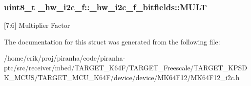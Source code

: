 \subsubsection[{\texorpdfstring{M\+U\+LT}{MULT}}]{\setlength{\rightskip}{0pt plus 5cm}uint8\+\_\+t \+\_\+hw\+\_\+i2c\+\_\+f\+::\+\_\+hw\+\_\+i2c\+\_\+f\+\_\+bitfields\+::\+M\+U\+LT}\hypertarget{struct__hw__i2c__f_1_1__hw__i2c__f__bitfields_ae12f63f9f20a5283884bcd839e7285d5}{}\label{struct__hw__i2c__f_1_1__hw__i2c__f__bitfields_ae12f63f9f20a5283884bcd839e7285d5}
\mbox{[}7\+:6\mbox{]} Multiplier Factor 

The documentation for this struct was generated from the following file\+:\begin{DoxyCompactItemize}
\item 
/home/erik/proj/piranha/code/piranha-\/ptc/src/receiver/mbed/\+T\+A\+R\+G\+E\+T\+\_\+\+K64\+F/\+T\+A\+R\+G\+E\+T\+\_\+\+Freescale/\+T\+A\+R\+G\+E\+T\+\_\+\+K\+P\+S\+D\+K\+\_\+\+M\+C\+U\+S/\+T\+A\+R\+G\+E\+T\+\_\+\+M\+C\+U\+\_\+\+K64\+F/device/device/\+M\+K64\+F12/M\+K64\+F12\+\_\+i2c.\+h\end{DoxyCompactItemize}
